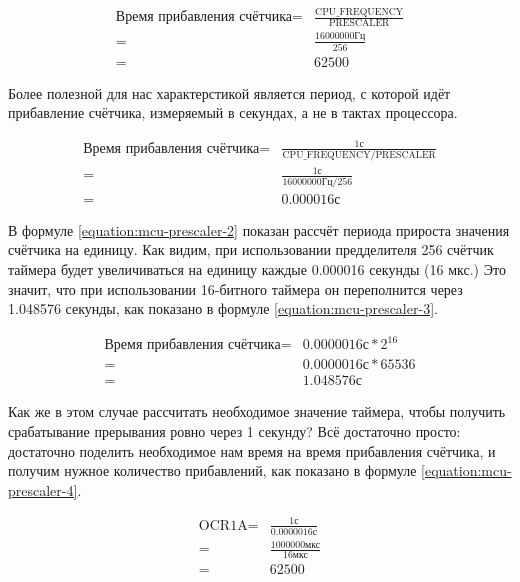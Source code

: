 \documentclass[../sparc.tex]{subfiles}
\begin{document}
\begin{align}
  \mbox{Время прибавления счётчика} =& \frac{\mbox{CPU\_FREQUENCY}}{\mbox{PRESCALER}} \nonumber \\
  =& \frac{16000000 \mbox{Гц}}{256} \nonumber \\
  =& 62500
  \label{equation:mcu-prescaler-1}
\end{align}

Более полезной для нас характерстикой является период, с которой идёт
прибавление счётчика, измеряемый в секундах, а не в тактах процессора.

\begin{align}
  \mbox{Время прибавления счётчика} =& \frac{1 \mbox{с}}{\mbox{CPU\_FREQUENCY} / \mbox{PRESCALER}} \nonumber \\
  =& \frac{1 \mbox{с}}{16000000 \mbox{Гц} / 256} \nonumber \\
  =& 0.000016 \mbox{с}
  \label{equation:mcu-prescaler-2}
\end{align}

В формуле \ref{equation:mcu-prescaler-2} показан рассчёт периода прироста
значения счётчика на единицу.  Как видим, при использовании предделителя 256
счётчик таймера будет увеличиваться на единицу каждые 0.000016 секунды (16 мкс.)
Это значит, что при использовании 16-битного таймера он переполнится через
1.048576 секунды, как показано в формуле \ref{equation:mcu-prescaler-3}.

\begin{align}
  \mbox{Время прибавления счётчика} =& 0.0000016\mbox{с} * 2^{16} \nonumber \\
  =& 0.0000016\mbox{с} * 65536 \nonumber \\
  =& 1.048576\mbox{с}
  \label{equation:mcu-prescaler-3}
\end{align}

Как же в этом случае рассчитать необходимое значение таймера, чтобы получить
срабатывание прерывания ровно через 1 секунду?  Всё достаточно просто:
достаточно поделить необходимое нам время на время прибавления счётчика, и
получим нужное количество прибавлений, как показано в формуле
\ref{equation:mcu-prescaler-4}.

\begin{align}
  \mbox{OCR1A} =& \frac{1\mbox{с}}{0.0000016\mbox{с}} \nonumber \\
  =& \frac{1000000\mbox{мкс}}{16\mbox{мкс}} \nonumber \\
  =& 62500
  \label{equation:mcu-prescaler-4}
\end{align}
\end{document}
